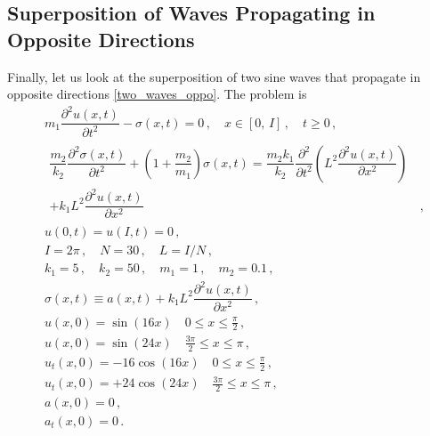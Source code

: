 \documentclass[11pt,a4paper,oneside,openright]{report} %
\begin{document}
\subsection{Superposition of Waves Propagating in Opposite Directions}
\noindent
Finally, let us look at the superposition of two sine waves that propagate in opposite directions \eqref{two_waves_oppo}. The problem is
\begin{subequations}\label{}
    \begin{align}
        & m_1 \dfrac{\partial^2 u(x,t)}{\partial t^2} - \sigma(x,t)  = 0 \, , \quad x \in \left[0, \, I \right] \, , \quad t \geq 0 \, ,\label{two_oppo_dirichlet_meta_1} \\[5pt]
        & \begin{aligned}
            \dfrac{m_2}{k_2} \dfrac{\partial^2 \sigma(x,t)}{\partial t^2}  + \left(1 + \dfrac{m_2}{m_1} \right) \sigma(x,t) = \dfrac{m_2 k_1}{k_2} \dfrac{\partial^2 }{\partial t^2 } \left(L^2 \dfrac{\partial^2 u(x,t)}{\partial x^2} \right) & \\ + k_1 L^2 \dfrac{\partial^2 u(x,t)}{\partial x^2} & \, ,
        \end{aligned} \label{two_oppo_dirichlet_meta_2} \\[5pt]
        & u(0, t) = u(I, t) = 0 \, , \label{two_oppo_dirichlet_meta_3} \\[5pt]
        & I = 2\pi \, , \quad N = 30 \, , \quad L = I/N \, , \label{two_oppo_dirichlet_meta_4} \\[5pt]
        & k_1 = 5 \, , \quad k_2 = 50 \, , \quad m_1 = 1 \, , \quad m_2 = 0.1 \, , \label{two_oppo_dirichlet_meta_5} \\[5pt]
        & \sigma(x,t) \equiv a(x,t) + k_1 L^2 \dfrac{\partial^2 u(x,t)}{\partial x^2} \, , \label{two_oppo_dirichlet_meta_12} \\[5pt]
        & u(x,0) = \sin{(16 x)} \quad 0 \leq x \leq \frac{\pi}{2} \, , \label{two_oppo_dirichlet_meta_6} \\[5pt]
        & u(x,0) = \sin{(24 x)} \quad \frac{3\pi}{2} \leq x \leq \pi \, , \label{two_oppo_dirichlet_meta_7} \\[5pt]
        & u_t(x,0) = - 16 \cos(16 x) \quad 0 \leq x \leq \frac{\pi}{2} \, , \label{two_oppo_dirichlet_meta_8} \\[5pt]
        & u_t(x,0) = + 24 \cos(24 x) \quad \frac{3\pi}{2} \leq x \leq \pi \, , \label{two_oppo_dirichlet_meta_9} \\[5pt]
        & a(x,0) = 0 \, , \label{two_oppo_dirichlet_meta_10} \\[5pt]
        & a_t(x,0) = 0 \, . \label{two_oppo_dirichlet_meta_11}
    \end{align}
\end{subequations}
\end{document}
